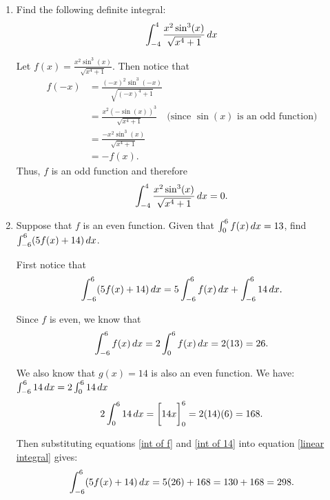 \documentclass[nooutcomes]{ximera}
\begin{document}
\begin{problem}

  \begin{enumerate}
    \item
      Find the following definite integral:
	\begin{equation*}
          \int_{-4}^4 \frac{x^2 \sin^3(x)}{\sqrt{x^4 + 1}} \,d x
	\end{equation*}
	\begin{freeResponse}
          Let $f(x) = \frac{x^2 \sin^3(x)}{\sqrt{x^4 + 1}}$.  
	  Then notice that
          \begin{align*}
            f(-x) &= \frac{(-x)^2 \sin^3(-x)}{\sqrt{(-x)^4 + 1}}  \\
                  &= \frac{x^2 (- \sin(x))^3}{\sqrt{x^4 + 1}}  \quad \text{(since } \sin(x) \text{ is an odd function)}  \\
                  &= \frac{- x^2 \sin^3(x)}{\sqrt{x^4 + 1}}  \\
                  &= -f(x).
          \end{align*}
          Thus, $f$ is an odd function and therefore
          \begin{equation*}
            \int_{-4}^4 \frac{x^2 \sin^3(x)}{\sqrt{x^4 + 1}} \,d x = 0.
          \end{equation*}
	\end{freeResponse}
		
	\item
          Suppose that $f$ is an even function.
          Given that $\int_0^6 f(x) \,d x = 13$, find $\int_{-6}^6 (5f(x) + 14) \,d x$.
          \begin{freeResponse}
            First notice that
            \begin{equation}\label{linear integral}
              \int_{-6}^6 (5f(x) + 14) \,d x = 5 \int_{-6}^6 f(x) \,d x + \int_{-6}^6 14 \,d x.
            \end{equation}
            
            Since $f$ is even, we know that
            \begin{equation}\label{int of f}
              \int_{-6}^6 f(x) \,d x = 2 \int_0^6 f(x) \,d x = 2 (13) = 26.
            \end{equation}
            
            We also know that $g(x)=14$ is also an even function.  We have:
             $\int_{-6}^6 14 \,d x = 2\int_{0}^6 14 \,d x$
            \begin{equation}\label{int of 14}
              2\int_{0}^6 14 \,d x = \bigg[ 14x \bigg]_{0}^6 = 2(14)(6) = 168.
            \end{equation}
            
            Then substituting equations \eqref{int of f} and \eqref{int of 14} into equation \eqref{linear integral} gives:
            \begin{equation*}
              \int_{-6}^6 (5f(x) + 14) \,d x = 5(26) + 168 = 130 + 168 = 298.
            \end{equation*}
          \end{freeResponse}
	\end{enumerate}
\end{problem}
\end{document}
